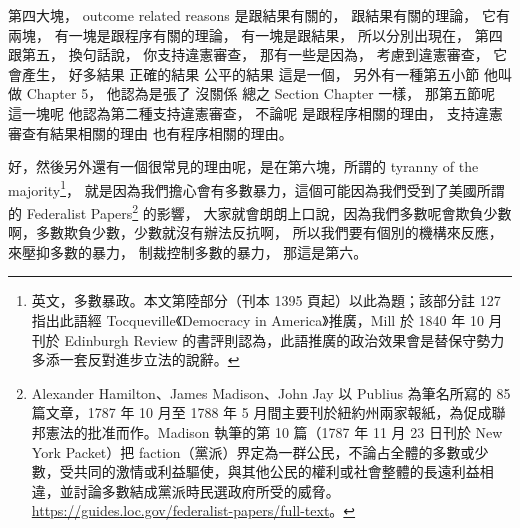 \hypertarget{w06:cue:57}{}第四大塊，
\hypertarget{w06:cue:58}{}outcome related reasons
\hypertarget{w06:cue:59}{}是跟結果有關的，
\hypertarget{w06:cue:60}{}跟結果有關的理論，
\hypertarget{w06:cue:61}{}它有兩塊，
\hypertarget{w06:cue:62}{}有一塊是跟程序有關的理論，
\hypertarget{w06:cue:63}{}有一塊是跟結果，
\hypertarget{w06:cue:64}{}所以分別出現在，
\hypertarget{w06:cue:65}{}第四跟第五，
\hypertarget{w06:cue:66}{}換句話說，
\hypertarget{w06:cue:67}{}你支持違憲審查，
\hypertarget{w06:cue:68}{}那有一些是因為，
\hypertarget{w06:cue:69}{}考慮到違憲審查，
\hypertarget{w06:cue:70}{}它會產生，
\hypertarget{w06:cue:71}{}好多結果 正確的結果 公平的結果 這是一個，
\hypertarget{w06:cue:72}{}另外有一種第五小節 他叫做 Chapter 5，
\hypertarget{w06:cue:73}{}他認為是張了 沒關係 總之 Section Chapter 一樣，
\hypertarget{w06:cue:74}{}那第五節呢 這一塊呢 他認為第二種支持違憲審查，
\hypertarget{w06:cue:75}{}不論呢 是跟程序相關的理由，
\hypertarget{w06:cue:76}{}支持違憲審查有結果相關的理由 也有程序相關的理由。

\hypertarget{w06:cue:77}{}好，然後另外還有一個很常見的理由呢，是在第六塊，所謂的 tyranny of the majority\footnote{英文，多數暴政。本文第陸部分（刊本 1395 頁起）以此為題；該部分註 127 指出此語經 Tocqueville《Democracy in America》推廣，Mill 於 1840 年 10 月刊於 Edinburgh Review 的書評則認為，此語推廣的政治效果會是替保守勢力多添一套反對進步立法的說辭。}，
\hypertarget{w06:cue:78}{}就是因為我們擔心會有多數暴力，這個可能因為我們受到了美國所謂的 Federalist Papers\footnote{Alexander Hamilton、James Madison、John Jay 以 Publius 為筆名所寫的 85 篇文章，1787 年 10 月至 1788 年 5 月間主要刊於紐約州兩家報紙，為促成聯邦憲法的批准而作。Madison 執筆的第 10 篇（1787 年 11 月 23 日刊於 New York Packet）把 faction（黨派）界定為一群公民，不論占全體的多數或少數，受共同的激情或利益驅使，與其他公民的權利或社會整體的長遠利益相違，並討論多數結成黨派時民選政府所受的威脅。\url{https://guides.loc.gov/federalist-papers/full-text}。} 的影響，
\hypertarget{w06:cue:79}{}大家就會朗朗上口說，因為我們多數呢會欺負少數啊，多數欺負少數，少數就沒有辦法反抗啊，
\hypertarget{w06:cue:80}{}所以我們要有個別的機構來反應，
\hypertarget{w06:cue:81}{}來壓抑多數的暴力，
\hypertarget{w06:cue:82}{}制裁控制多數的暴力，
\hypertarget{w06:cue:83}{}那這是第六。

